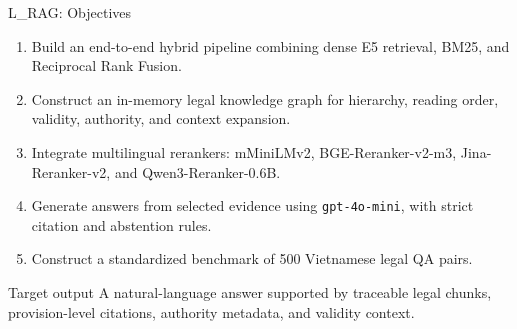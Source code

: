 \begin{frame}{L\_RAG: Objectives}
\small
\begin{enumerate}
  \item Build an end-to-end hybrid pipeline combining dense E5 retrieval, BM25, and Reciprocal Rank Fusion.
  \item Construct an in-memory legal knowledge graph for hierarchy, reading order, validity, authority, and context expansion.
  \item Integrate multilingual rerankers: mMiniLMv2, BGE-Reranker-v2-m3, Jina-Reranker-v2, and Qwen3-Reranker-0.6B.
  \item Generate answers from selected evidence using \texttt{gpt-4o-mini}, with strict citation and abstention rules.
  \item Construct a standardized benchmark of 500 Vietnamese legal QA pairs.
\end{enumerate}
\vspace{0.2cm}
\begin{block}{Target output}
A natural-language answer supported by traceable legal chunks, provision-level citations, authority metadata, and validity context.
\end{block}
\end{frame}
